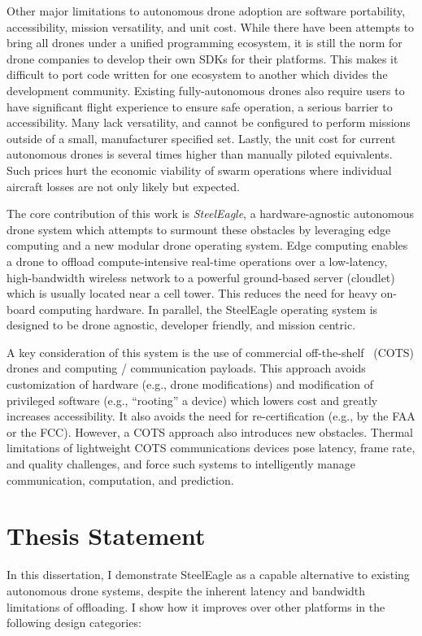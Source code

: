 Other major limitations to autonomous drone adoption are software portability, accessibility, mission versatility, and unit cost. While there have been attempts to bring all drones under a unified programming ecosystem, it is still the norm for drone companies to develop their own SDKs for their platforms. This makes it difficult to port code written for one ecosystem to another which divides the development community. Existing fully-autonomous drones also require users to have significant flight experience to ensure safe operation, a serious barrier to accessibility. Many lack versatility, and cannot be configured to perform missions outside of a small, manufacturer specified set. Lastly, the unit cost for current autonomous drones is several times higher than manually piloted equivalents. Such prices hurt the economic viability of swarm operations where individual aircraft losses are not only likely but expected.

The core contribution of this work is \textit{SteelEagle}, a hardware-agnostic autonomous drone system which attempts to surmount these obstacles by leveraging edge computing and a new modular drone operating system. Edge computing enables a drone to offload compute-intensive real-time operations over a low-latency, high-bandwidth wireless network to a powerful ground-based server (cloudlet) which is usually located near a cell tower. This reduces the need for heavy on-board computing hardware. In parallel, the SteelEagle operating system is designed to be drone agnostic, developer friendly, and mission centric.

A key consideration of this system is the use of commercial off-the-shelf~\cite{FAR} (COTS) drones and computing / communication payloads. This approach avoids customization of hardware (e.g., drone modifications) and modification of privileged software (e.g., “rooting” a device) which lowers cost and greatly increases accessibility. It also avoids the need for re-certification (e.g., by the FAA or the FCC). However, a COTS approach also introduces new obstacles. Thermal limitations of lightweight COTS communications devices pose latency, frame rate, and quality challenges, and force such systems to intelligently manage communication, computation, and prediction.

\section{Thesis Statement}
In this dissertation, I demonstrate SteelEagle as a capable alternative to existing autonomous drone systems, despite the inherent latency and bandwidth limitations of offloading. I show how it improves over other platforms in the following design categories:

